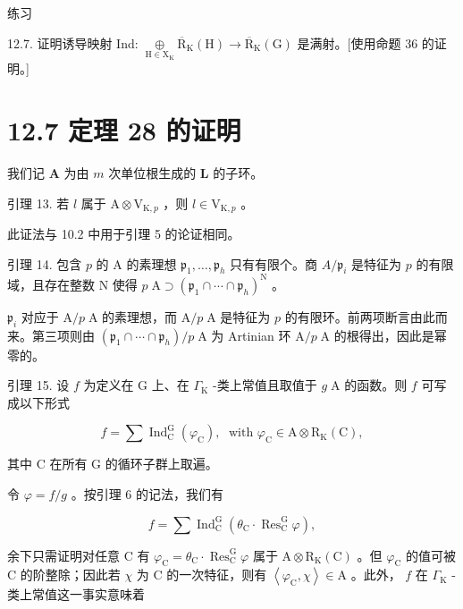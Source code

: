 \documentclass[10pt]{article}
\begin{document}
练习

12.7. 证明诱导映射 Ind: \(\underset{\mathrm{H} \in  {\mathrm{X}}_{\mathrm{K}}}{ \oplus  }{\overline{\mathrm{R}}}_{\mathrm{K}}\left( \mathrm{H}\right)  \rightarrow  {\overline{\mathrm{R}}}_{\mathrm{K}}\left( \mathrm{G}\right)\) 是满射。[使用命题 36 的证明。]

\section*{12.7 定理 28 的证明}

我们记 \(\mathbf{A}\) 为由 \(m\) 次单位根生成的 \(\mathbf{L}\) 的子环。

引理 13. 若 \(l\) 属于 \(\mathrm{A} \otimes  {\mathrm{V}}_{\mathrm{K},p}\) ，则 \(l \in  {\mathrm{V}}_{\mathrm{K},p}\) 。

此证法与 10.2 中用于引理 5 的论证相同。

引理 14. 包含 \(p\) 的 \(\mathrm{A}\) 的素理想 \({\mathfrak{p}}_{1},\ldots ,{\mathfrak{p}}_{h}\) 只有有限个。商 \(A/{\mathfrak{p}}_{i}\) 是特征为 \(p\) 的有限域，且存在整数 \(\mathrm{N}\) 使得 \(p\mathrm{\;A} \supset  {\left( {\mathfrak{p}}_{1} \cap  \cdots  \cap  {\mathfrak{p}}_{h}\right) }^{\mathrm{N}}\) 。

\({\mathfrak{p}}_{i}\) 对应于 \(\mathrm{A}/p\mathrm{\;A}\) 的素理想，而 \(\mathrm{A}/p\mathrm{\;A}\) 是特征为 \(p\) 的有限环。前两项断言由此而来。第三项则由 \(\left( {{\mathfrak{p}}_{1} \cap  \cdots  \cap  {\mathfrak{p}}_{h}}\right) /p\mathrm{\;A}\) 为 Artinian 环 \(\mathrm{A}/p\mathrm{\;A}\) 的根得出，因此是幂零的。

引理 15. 设 \(f\) 为定义在 \(\mathrm{G}\) 上、在 \({\Gamma }_{\mathrm{K}}\) -类上常值且取值于 \(g\mathrm{\;A}\) 的函数。则 \(f\) 可写成以下形式

\[
f = \sum {\operatorname{Ind}}_{\mathrm{C}}^{\mathrm{G}}\left( {\varphi }_{\mathrm{C}}\right) ,\;\text{ with }{\varphi }_{\mathrm{C}} \in  \mathrm{A} \otimes  {\mathrm{R}}_{\mathrm{K}}\left( \mathrm{C}\right) ,
\]

其中 \(\mathrm{C}\) 在所有 \(\mathrm{G}\) 的循环子群上取遍。

令 \(\varphi  = f/g\) 。按引理 6 的记法，我们有

\[
f = \sum {\operatorname{Ind}}_{\mathrm{C}}^{\mathrm{G}}\left( {{\theta }_{\mathrm{C}} \cdot  {\operatorname{Res}}_{\mathrm{C}}^{\mathrm{G}}\varphi }\right) ,
\]

余下只需证明对任意 \(\mathrm{C}\) 有 \({\varphi }_{\mathrm{C}} = {\theta }_{\mathrm{C}} \cdot  {\operatorname{Res}}_{\mathrm{C}}^{\mathrm{G}}\varphi\) 属于 \(\mathrm{A} \otimes  {\mathrm{R}}_{\mathrm{K}}\left( \mathrm{C}\right)\) 。但 \({\varphi }_{\mathrm{C}}\) 的值可被 \(\mathrm{C}\) 的阶整除；因此若 \(\chi\) 为 \(\mathrm{C}\) 的一次特征，则有 \(\left\langle  {{\varphi }_{\mathrm{C}},\chi }\right\rangle   \in  \mathrm{A}\) 。此外， \(f\) 在 \({\Gamma }_{\mathrm{K}}\) -类上常值这一事实意味着
\end{document}
